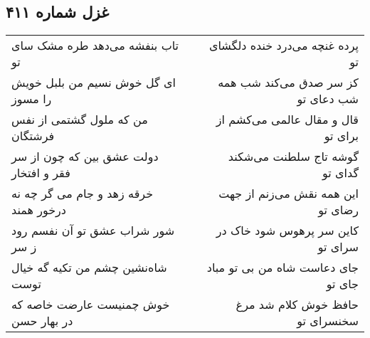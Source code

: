 \begin{center}
\section*{غزل شماره ۴۱۱}
\label{sec:sh411}
\begin{longtable}{l p{0.5cm} r}
تاب بنفشه می‌دهد طره مشک سای تو
&&
پرده غنچه می‌درد خنده دلگشای تو
\\
ای گل خوش نسیم من بلبل خویش را مسوز
&&
کز سر صدق می‌کند شب همه شب دعای تو
\\
من که ملول گشتمی از نفس فرشتگان
&&
قال و مقال عالمی می‌کشم از برای تو
\\
دولت عشق بین که چون از سر فقر و افتخار
&&
گوشه تاج سلطنت می‌شکند گدای تو
\\
خرقه زهد و جام می گر چه نه درخور همند
&&
این همه نقش می‌زنم از جهت رضای تو
\\
شور شراب عشق تو آن نفسم رود ز سر
&&
کاین سر پرهوس شود خاک در سرای تو
\\
شاه‌نشین چشم من تکیه گه خیال توست
&&
جای دعاست شاه من بی تو مباد جای تو
\\
خوش چمنیست عارضت خاصه که در بهار حسن
&&
حافظ خوش کلام شد مرغ سخنسرای تو
\\
\end{longtable}
\end{center}
